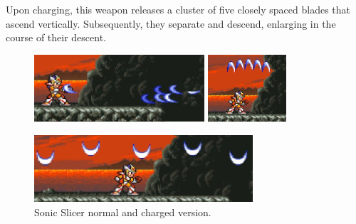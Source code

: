 Upon charging, this weapon releases a cluster of five closely spaced blades that ascend vertically. Subsequently, they separate and descend, enlarging in the course of their descent.
\begin{figure}[htp]
		\centering
		\includegraphics[height=2.5cm]{figures/X2/weapons/S_slicer_1.png}	
		\includegraphics[height=2.5cm]{figures/X2/weapons/S_slicer_2.png}	
		
		\vspace{2pt}
		
		\includegraphics[height=2.5cm]{figures/X2/weapons/S_slicer_3.png}	
	\caption{Sonic Slicer normal and charged version.}
\end{figure}

